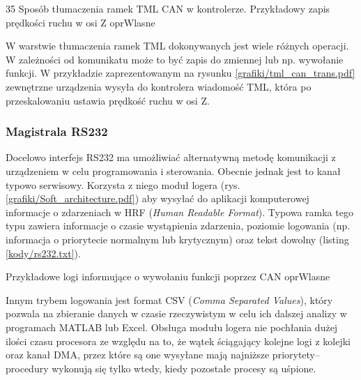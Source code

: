 	{35}
	{Sposób tłumaczenia ramek TML CAN w kontrolerze. Przykładowy zapis prędkości ruchu w osi Z}
	{oprWlasne}
	
W warstwie tłumaczenia ramek TML dokonywanych jest wiele różnych operacji. W zależności od komunikatu może to być zapis do zmiennej lub np. wywołanie funkcji. W przykładzie zaprezentowanym na rysunku \ref{grafiki/tml_can_trans.pdf} zewnętrzne urządzenia wysyła do kontrolera wiadomość TML, która po przeskalowaniu ustawia prędkość ruchu w osi Z.

\subsubsection{Magistrala RS232}
\label{ss:hwrs232}

Docelowo interfejs RS232 ma umożliwiać alternatywną metodę komunikacji z urządzeniem w celu programowania i sterowania. Obecnie jednak jest to kanał typowo serwisowy. Korzysta z niego moduł logera (rys. \ref{grafiki/Soft_architecture.pdf}) aby wysyłać do aplikacji komputerowej informacje o zdarzeniach w HRF ({\it Human Readable Format}). Typowa ramka tego typu zawiera informacje o czasie wystąpienia zdarzenia, poziomie logowania (np. informacja o priorytecie normalnym lub krytycznym) oraz tekst dowolny (listing \ref{kody/rs232.txt}). 

		   {}
		   {Przykładowe logi informujące o wywołaniu funkcji poprzez CAN}
		   {oprWlasne}
		   
Innym trybem logowania jest format CSV ({\it Comma Separated Values}), który pozwala na zbieranie danych w czasie rzeczywistym w celu ich dalszej analizy w programach MATLAB lub Excel. Obsługa modułu logera nie pochłania dużej ilości czasu procesora ze względu na to, że wątek ściągający kolejne logi z kolejki oraz kanał DMA, przez które są one wysyłane mają najniższe priorytety-- procedury wykonują się tylko wtedy, kiedy pozostałe procesy są uśpione.



\clearpage








